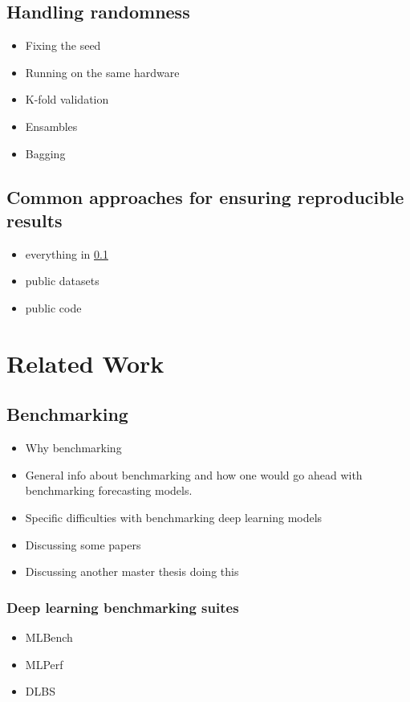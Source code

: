 \subsection{Handling randomness}
\label{subsec:reproducibility}
\begin{itemize}
\item  Fixing the seed
\item Running on the same hardware
\item K-fold validation
\item Ensambles
\item Bagging
\end{itemize}
\subsection{Common approaches for ensuring reproducible results}
\begin{itemize}
\item everything in \ref{subsec:reproducibility}
\item public datasets
\item public code
\end{itemize}

\section{Related Work}
\label{subsec:related_work}
\subsection{Benchmarking}
\begin{itemize}
\item Why benchmarking
\item General info about benchmarking and how one would go ahead with benchmarking forecasting models.
\end{itemize}
\begin{itemize}
\item Specific difficulties with benchmarking deep learning models
\item Discussing some papers
\item Discussing another master thesis doing this
\end{itemize}

\subsubsection{Deep learning benchmarking suites}
\begin{itemize}
\item MLBench
\item MLPerf
\item DLBS
\end{itemize}

